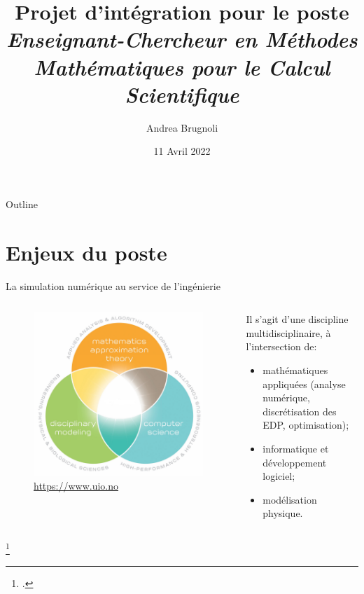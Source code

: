 \documentclass[aspectratio=169, french]{ISAE-Beamer}
\title[Projet d'intégration]{Projet d'intégration pour le poste\\ \small
\textit{Enseignant-Chercheur en Méthodes Mathématiques pour le Calcul Scientifique}}
\author[Andrea Brugnoli]{Andrea Brugnoli}
\date[11/4/22]{11 Avril 2022}
\begin{document}
	
	
	\maketitle
	
	
	\begin{frame}{Outline}
		
		\tableofcontents
		
	\end{frame}
	
	\section{Enjeux du poste}
	
	\begin{frame}{La simulation numérique au service de l'ingénierie}
		
		\begin{columns}
			\begin{column}{.45\textwidth}
			\begin{figure}
				\includegraphics[width=.9\textwidth]{cse.jpg}
				\caption{\href{https://www.uio.no/english/studies/programmes/computational-science-master/why-choose/}{https://www.uio.no}}
			\end{figure}	
			\end{column}
			\begin{column}{.5\textwidth}
			Il s'agit d'une discipline multidisciplinaire, à l'intersection de\footnotemark :
			\begin{itemize}
				\item mathématiques appliquées (analyse numérique, discrétisation des EDP, optimisation);
				\item informatique et développement logiciel;
				\item modélisation physique.
			\end{itemize}
			
			\end{column}
		\end{columns}	
		\footcitetext{ulrich2018cse}
	\end{frame}
\end{document}

